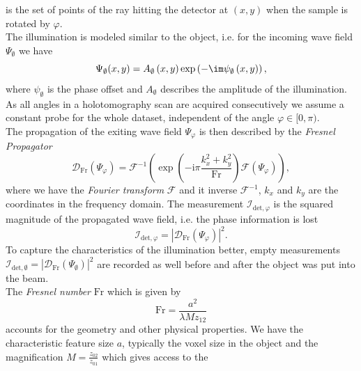 is the set of points of the ray hitting the detector at $(x,y)$ when the sample is rotated by $\varphi$.
\\
The illumination is modeled similar to the object, i.e. for the incoming wave
field $\Psi_\emptyset$ we have
\begin{equation}
  \Psi_\emptyset (x,y) = A_\emptyset\left( x,y \right) \exp \left(-  \im \psi_\emptyset\left( x,y \right) \right),
  \label{eq:incoming_wave_field}
\end{equation}
where \( \psi_\emptyset \) is the phase  offset and \( A_\emptyset \) describes the amplitude of the illumination.
As all angles in a holotomography scan are acquired consecutively we assume a
constant probe for the whole dataset, independent of the angle $\varphi \in
[0, \pi)$. \\
The propagation of the exiting wave field $\Psi_\varphi$ is then described by
the \textit{Fresnel Propagator}
\begin{equation}
  \mathcal{D}_\mathrm{Fr} \left( \Psi_\varphi \right) =  \mathcal{F}^{-1} \left( \exp \left( -\mathrm{i} \pi \frac{k_x ^2 +
  k_y ^2}{\mathrm{Fr}} \right) \mathcal{F}\left( \Psi_\varphi \right)   \right), 
  \label{eq:propagation} 
\end{equation}
where we have the \textit{Fourier transform} \(  \mathcal{F} \) and it inverse \(  \mathcal{F}^{-1} \), \( k_x \) and \( k_y \) are the coordinates in the frequency domain.
The measurement \( \mathcal{I}_{\mathrm{det}, \varphi}
\) is the squared magnitude of the propagated wave field, i.e. the phase
information is lost
\begin{equation}
  \mathcal{I}_{\mathrm{det}, \varphi} = \left| \mathcal{D}_\mathrm{Fr}\left( \Psi_\varphi \right)  \right| ^2.
  \label{eq:measurement}
\end{equation}
To capture the characteristics of the illumination better, empty measurements \( \mathcal{I}_{\mathrm{det}, \emptyset} = \left| \mathcal{D}_\mathrm{Fr} \left( \Psi_\emptyset \right)  \right|^2 \) are recorded as well before and after the object was put into the beam.\\ 
The \textit{Fresnel number} \( \mathrm{Fr} \) which is given by
\begin{equation}
  \mathrm{Fr} = \frac{a^2}{\lambda M z_{12}}
\label{eq:Fresnel_nr}
\end{equation}
accounts for the geometry and other physical properties.
We have the characteristic feature size $a$, typically the voxel size in the object and the magnification $M = \frac{z_{02}}{z_{01}}$ which gives access to the
